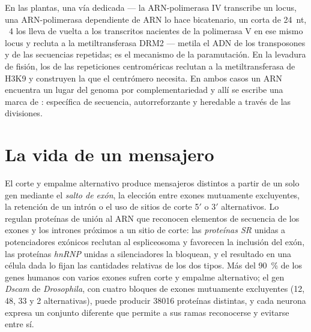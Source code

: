 \begin{proposition}\label{prop:b3:rna-regulation:rddm}
En las plantas, una vía dedicada --- la ARN-polimerasa IV transcribe un
locus, una ARN-polimerasa dependiente de ARN lo hace bicatenario, un
 corta  de \qty{24}{nt}, ~4 los lleva de vuelta a los
transcritos nacientes de la polimerasa V en ese mismo locus y recluta a
la metiltransferasa DRM2 --- metila el ADN de los transposones y de las
secuencias repetidas; es el mecanismo de la paramutación. En la levadura
de fisión, los  de las repeticiones centroméricas reclutan a la
metiltransferasa de H3K9 y construyen la  que el
centrómero necesita. En ambos casos un ARN encuentra un lugar del genoma
por complementariedad y allí se escribe una marca de :
específica de secuencia, autorreforzante y heredable a través de las
divisiones.
\end{proposition}

\section{La vida de un mensajero}

\begin{definition}\label{def:b3:rna-regulation:splicing}
El corte y empalme alternativo produce mensajeros distintos a partir de
un solo gen mediante el \emph{salto de exón}, la elección entre exones
mutuamente excluyentes, la retención de un intrón o el uso de sitios de
corte 5$'$ o 3$'$ alternativos. Lo regulan proteínas de unión al ARN que
reconocen elementos de secuencia de los exones y los intrones próximos a
un sitio de corte: las \emph{proteínas SR} unidas a potenciadores
exónicos reclutan al espliceosoma y favorecen la inclusión del exón, las
proteínas \emph{hnRNP} unidas a silenciadores la bloquean, y el resultado
en una célula dada lo fijan las cantidades relativas de los dos tipos.
Más del \qty{90}{\%} de los genes humanos con varios exones sufren corte
y empalme alternativo; el gen \emph{Dscam} de \emph{Drosophila}, con
cuatro bloques de exones mutuamente excluyentes (12, 48, 33 y 2
alternativas), puede producir \num{38016} proteínas distintas, y cada
neurona expresa un conjunto diferente que permite a sus ramas
reconocerse y evitarse entre sí.
\end{definition}

